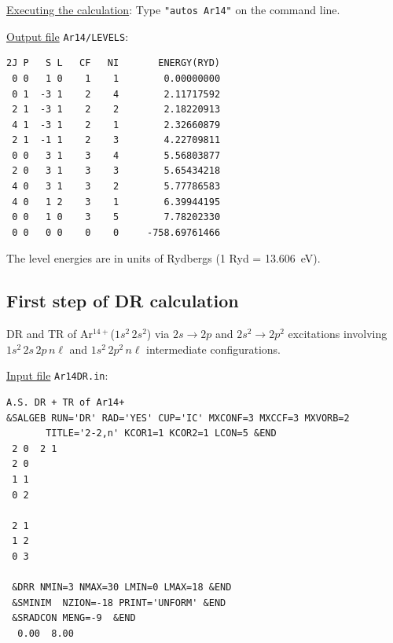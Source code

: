 \documentclass[a4paper,12pt]{article}
\begin{document}
\underline{Executing the calculation}: Type \texttt{"autos Ar14"} on the command line.

\underline{Output file} \texttt{Ar14/LEVELS}:
\begin{verbatim}
2J P   S L   CF   NI       ENERGY(RYD)
 0 0   1 0    1    1        0.00000000
 0 1  -3 1    2    4        2.11717592
 2 1  -3 1    2    2        2.18220913
 4 1  -3 1    2    1        2.32660879
 2 1  -1 1    2    3        4.22709811
 0 0   3 1    3    4        5.56803877
 2 0   3 1    3    3        5.65434218
 4 0   3 1    3    2        5.77786583
 4 0   1 2    3    1        6.39944195
 0 0   1 0    3    5        7.78202330
 0 0   0 0    0    0     -758.69761466
\end{verbatim}
The level energies are in units of Rydbergs (1 Ryd = 13.606~eV).

\subsection{First step of DR calculation}\label{autos:DRstep1}

DR and TR of Ar$^{14+}$($1s^2\,2s^2$) via $2s\to2p$ and $2s^2\to2p^2$ excitations involving $1s^2\,2s\,2p\,n\ell$ and $1s^2\,2p^2\,n\ell$ intermediate configurations.

\underline{Input file} \texttt{Ar14DR.in}:
\begin{verbatim}
A.S. DR + TR of Ar14+
&SALGEB RUN='DR' RAD='YES' CUP='IC' MXCONF=3 MXCCF=3 MXVORB=2
       TITLE='2-2,n' KCOR1=1 KCOR2=1 LCON=5 &END
 2 0  2 1
 2 0
 1 1
 0 2

 2 1
 1 2
 0 3

 &DRR NMIN=3 NMAX=30 LMIN=0 LMAX=18 &END
 &SMINIM  NZION=-18 PRINT='UNFORM' &END
 &SRADCON MENG=-9  &END
  0.00  8.00
\end{verbatim}
\end{document}
